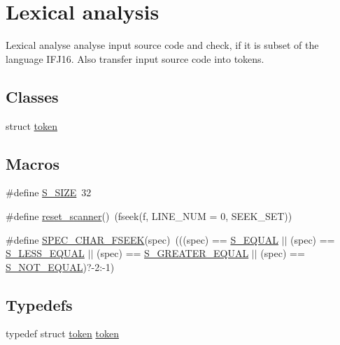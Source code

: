 \hypertarget{group__lexical__analysis}{}\section{Lexical analysis}
\label{group__lexical__analysis}


Lexical analyse analyse input source code and check, if it is subset of the language I\+F\+J16. Also transfer input source code into tokens.  


\subsection*{Classes}
\begin{DoxyCompactItemize}
\item 
struct \hyperlink{structtoken}{token}
\end{DoxyCompactItemize}
\subsection*{Macros}
\begin{DoxyCompactItemize}
\item 
\#define \hyperlink{group__lexical__analysis_gae527d47b61cec23db07c8142dd7b3454}{S\+\_\+\+S\+I\+Z\+E}~32
\item 
\#define \hyperlink{group__lexical__analysis_ga1f93f64777731443e51ee94601b3195c}{reset\+\_\+scanner}()~(fseek(f, L\+I\+N\+E\+\_\+\+N\+U\+M = 0, S\+E\+E\+K\+\_\+\+S\+E\+T))
\item 
\#define \hyperlink{group__lexical__analysis_gac470f012657c70805eb73ae2d23dfcd2}{S\+P\+E\+C\+\_\+\+C\+H\+A\+R\+\_\+\+F\+S\+E\+E\+K}(spec)~(((spec) == \hyperlink{group__lexical__analysis_gga99fb83031ce9923c84392b4e92f956b5aca36b0df9641e4e26d8bf3f7acdd9c1e}{S\+\_\+\+E\+Q\+U\+A\+L} $\vert$$\vert$ (spec) == \hyperlink{group__lexical__analysis_gga99fb83031ce9923c84392b4e92f956b5a539b597cbeb7b0504d07e74fe4c1e94e}{S\+\_\+\+L\+E\+S\+S\+\_\+\+E\+Q\+U\+A\+L} $\vert$$\vert$ (spec) == \hyperlink{group__lexical__analysis_gga99fb83031ce9923c84392b4e92f956b5a47e80e9966826028a795c61a4965b6d6}{S\+\_\+\+G\+R\+E\+A\+T\+E\+R\+\_\+\+E\+Q\+U\+A\+L} $\vert$$\vert$ (spec) == \hyperlink{group__lexical__analysis_gga99fb83031ce9923c84392b4e92f956b5a4c20fc681a0ad89811886c58c8af6885}{S\+\_\+\+N\+O\+T\+\_\+\+E\+Q\+U\+A\+L})?-\/2\+:-\/1)
\end{DoxyCompactItemize}
\subsection*{Typedefs}
\begin{DoxyCompactItemize}
\item 
typedef struct \hyperlink{structtoken}{token} \hyperlink{group__lexical__analysis_gacda13b36416bdee4294453dd28b0fdc4}{token}
\end{DoxyCompactItemize}
